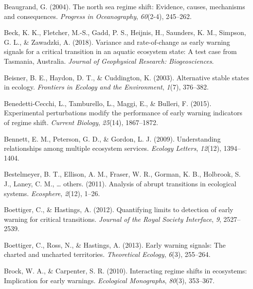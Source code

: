 \documentclass[12pt,twoside,openany]{reedthesis}
\begin{document}
\leavevmode\hypertarget{ref-beaugrand2004north}{}%
Beaugrand, G. (2004). The north sea regime shift: Evidence, causes, mechanisms and consequences. \emph{Progress in Oceanography}, \emph{60}(2-4), 245--262.

\leavevmode\hypertarget{ref-beck_variance_2018}{}%
Beck, K. K., Fletcher, M.-S., Gadd, P. S., Heijnis, H., Saunders, K. M., Simpson, G. L., \& Zawadzki, A. (2018). Variance and rate-of-change as early warning signals for a critical transition in an aquatic ecosystem state: A test case from Tasmania, Australia. \emph{Journal of Geophysical Research: Biogeosciences}.

\leavevmode\hypertarget{ref-beisner2003alternative}{}%
Beisner, B. E., Haydon, D. T., \& Cuddington, K. (2003). Alternative stable states in ecology. \emph{Frontiers in Ecology and the Environment}, \emph{1}(7), 376--382.

\leavevmode\hypertarget{ref-benedetti2015experimental}{}%
Benedetti-Cecchi, L., Tamburello, L., Maggi, E., \& Bulleri, F. (2015). Experimental perturbations modify the performance of early warning indicators of regime shift. \emph{Current Biology}, \emph{25}(14), 1867--1872.

\leavevmode\hypertarget{ref-bennett2009understanding}{}%
Bennett, E. M., Peterson, G. D., \& Gordon, L. J. (2009). Understanding relationships among multiple ecosystem services. \emph{Ecology Letters}, \emph{12}(12), 1394--1404.

\leavevmode\hypertarget{ref-bestelmeyer_analysis_2011}{}%
Bestelmeyer, B. T., Ellison, A. M., Fraser, W. R., Gorman, K. B., Holbrook, S. J., Laney, C. M., \ldots{} others. (2011). Analysis of abrupt transitions in ecological systems. \emph{Ecosphere}, \emph{2}(12), 1--26.

\leavevmode\hypertarget{ref-boettiger_quantifying_2012}{}%
Boettiger, C., \& Hastings, A. (2012). Quantifying limits to detection of early warning for critical transitions. \emph{Journal of the Royal Society Interface}, \emph{9}, 2527--2539.

\leavevmode\hypertarget{ref-boettiger_early_2013}{}%
Boettiger, C., Ross, N., \& Hastings, A. (2013). Early warning signals: The charted and uncharted territories. \emph{Theoretical Ecology}, \emph{6}(3), 255--264.

\leavevmode\hypertarget{ref-brock2010interacting}{}%
Brock, W. A., \& Carpenter, S. R. (2010). Interacting regime shifts in ecosystems: Implication for early warnings. \emph{Ecological Monographs}, \emph{80}(3), 353--367.
\end{document}
